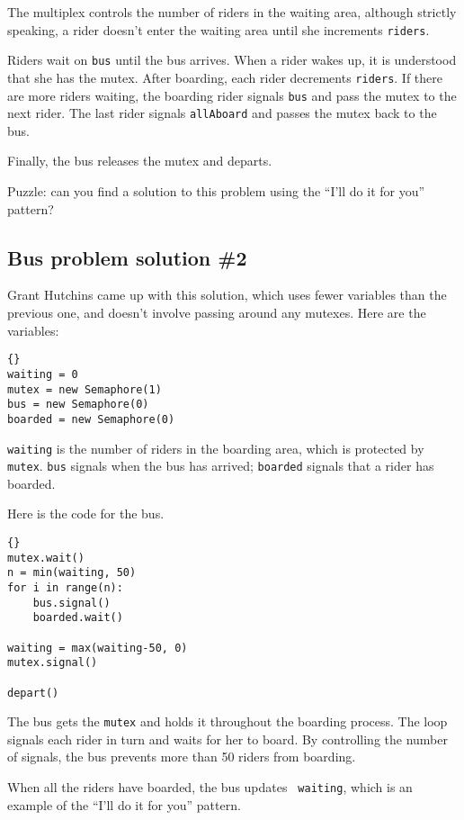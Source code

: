 \documentclass{book}
\newcommand{\clearemptydoublepage}{\newpage\cleardoublepage}
\begin{document}
The multiplex controls the number of riders in the waiting area,
although strictly speaking, a rider doesn't enter the waiting
area until she increments {\tt riders}.

Riders wait on {\tt bus} until the bus arrives.  When a rider
wakes up, it is understood that she has the mutex.
After boarding, each rider decrements {\tt riders}.  If there
are more riders waiting, the boarding rider signals {\tt bus}
and pass the mutex to the next rider.  The last rider signals
{\tt allAboard} and passes the mutex back to the bus.

Finally, the bus releases the mutex and departs.

Puzzle: can you find a solution to this problem using the
``I'll do it for you'' pattern?


\clearemptydoublepage
\subsection {Bus problem solution \#2}

Grant Hutchins came up with this solution, which uses fewer
variables than the previous one, and doesn't involve passing
around any mutexes.  Here are the variables:

\begin{lstlisting}[title={Bus problem solution \#2 (initialization)}]{}
waiting = 0
mutex = new Semaphore(1)
bus = new Semaphore(0)
boarded = new Semaphore(0)
\end{lstlisting}

{\tt waiting} is the number of riders in the boarding area,
which is protected by {\tt mutex}.  {\tt bus} signals when the
bus has arrived; {\tt boarded} signals that a rider has boarded.

Here is the code for the bus.

\begin{lstlisting}[title={Bus problem solution (bus)}]{}
mutex.wait()
n = min(waiting, 50)
for i in range(n):
    bus.signal()
    boarded.wait()

waiting = max(waiting-50, 0)
mutex.signal()

depart()
\end{lstlisting}

The bus gets the {\tt mutex} and holds it throughout the boarding
process.  The loop signals each rider in turn and waits for her to
board.  By controlling the number of signals, the bus prevents
more than 50 riders from boarding.

When all the riders have boarded, the bus updates {\tt
waiting}, which is an example of the ``I'll do it for you'' pattern.
\end{document}
